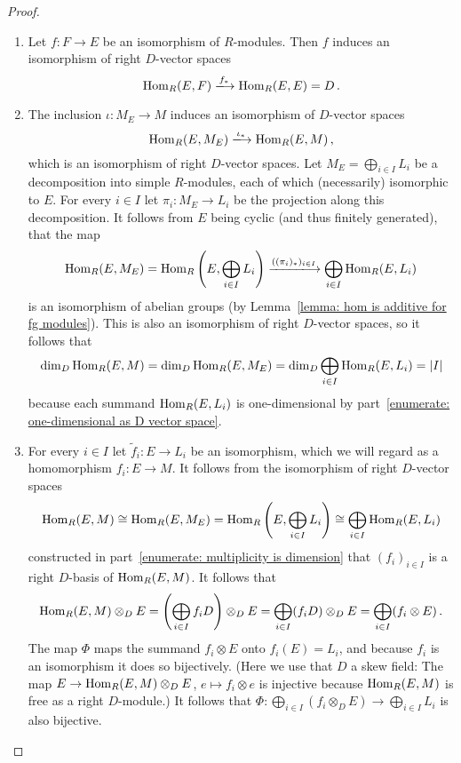 \begin{proof}
  \leavevmode
  \begin{enumerate}
    \item
      Let $f \colon F \to E$ be an isomorphism of $R$-modules.
      Then $f$ induces an isomorphism of right $D$-vector spaces
      \[
                              \Hom_R(E,F)
        \xlongrightarrow{f_*} \Hom_R(E,E)
        =                     D \,.
      \]
    \item
      The inclusion $\iota \colon M_E \to M$ induces an isomorphism of $D$-vector spaces
      \[
                                  \Hom_R(E, M_E)
        \xlongrightarrow{\iota_*} \Hom_R(E, M) \,,
      \]
      which is an isomorphism of right $D$-vector spaces.
      Let $M_E = \bigoplus_{i \in I} L_i$ be a decomposition into simple $R$-modules, each of which (necessarily) isomorphic to $E$.
      For every $i \in I$ let $\pi_i \colon M_E \to L_i$ be the projection along this decomposition.
      It follows from $E$ being cyclic (and thus finitely generated), that the map
      \[
              \Hom_R(E, M_E)
        =     \Hom_R\left(E, \bigoplus_{i \in I} L_i \right)
        \xlongrightarrow{((\pi_i)_*)_{i \in I}}
              \bigoplus_{i \in I} \Hom_R(E, L_i)
      \]
      is an isomorphism of abelian groups (by Lemma~\ref{lemma: hom is additive for fg modules}).
      This is also an isomorphism of right $D$-vector spaces, so it follows that
      \[
          \dim_D \operatorname{Hom}_R(E, M)
        = \dim_D \operatorname{Hom}_R(E, M_E)
        = \dim_D \bigoplus_{i \in I} \operatorname{Hom}_R(E, L_i)
        = |I|
      \]
      because each summand $\operatorname{Hom}_R(E, L_i)$ is one-dimensional by part~\ref*{enumerate: one-dimensional as D vector space}.
    \item
      For every $i \in I$ let $\tilde{f}_i \colon E \to L_i$ be an isomorphism, which we will regard as a homomorphism $f_i \colon E \to M$.
      It follows from the isomorphism of right $D$-vector spaces
      \[
              \operatorname{Hom}_R(E, M)
        \cong \operatorname{Hom}_R(E, M_E)
        =     \operatorname{Hom}_R\left(E, \bigoplus_{i \in I} L_i \right)
        \cong \bigoplus_{i \in I} \operatorname{Hom}_R(E, L_i)
      \]
      constructed in part~\ref*{enumerate: multiplicity is dimension} that $(f_i)_{i \in I}$ is a right $D$-basis of $\operatorname{Hom}_R(E,M)$.
      It follows that
      \[
          \operatorname{Hom}_R(E, M) \otimes_D E
        = \left( \bigoplus_{i \in I} f_i D \right) \otimes_D E
        = \bigoplus_{i \in I} (f_i D) \otimes_D E
        = \bigoplus_{i \in I} (f_i \otimes E) \,.
      \]
      The map $\Phi$ maps the summand $f_i \otimes E$ onto $f_i(E) = L_i$, and because $f_i$ is an isomorphism it does so bijectively.
      (Here we use that $D$ a skew field:
      The map $E \to \operatorname{Hom}_R(E, M) \otimes_D E$, $e \mapsto f_i \otimes e$ is injective because $\operatorname{Hom}_R(E,M)$ is free as a right $D$-module.)
      It follows that $\Phi \colon \bigoplus_{i \in I} (f_i \otimes_D E) \to \bigoplus_{i \in I} L_i$ is also bijective.
      

\end{enumerate}
\end{proof}
